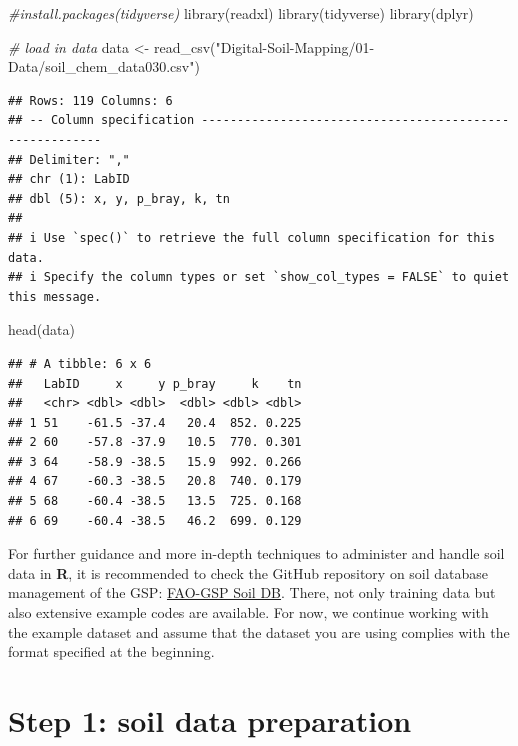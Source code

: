 \documentclass[
  10pt,
  b5paper,
  oneside]{book}
\newenvironment{Shaded}{\begin{snugshade}}{\end{snugshade}}
\newcommand{\CommentTok}[1]{\textcolor[rgb]{0.56,0.35,0.01}{\textit{#1}}}
\newcommand{\FunctionTok}[1]{\textcolor[rgb]{0.00,0.00,0.00}{#1}}
\newcommand{\NormalTok}[1]{#1}
\newcommand{\OtherTok}[1]{\textcolor[rgb]{0.56,0.35,0.01}{#1}}
\newcommand{\StringTok}[1]{\textcolor[rgb]{0.31,0.60,0.02}{#1}}
\begin{document}
\begin{Shaded}
\begin{Highlighting}[]
\CommentTok{\#install.packages(tidyverse)}
\FunctionTok{library}\NormalTok{(readxl)}
\FunctionTok{library}\NormalTok{(tidyverse)}
\FunctionTok{library}\NormalTok{(dplyr)}

\CommentTok{\# load in data}
\NormalTok{data }\OtherTok{\textless{}{-}} \FunctionTok{read\_csv}\NormalTok{(}\StringTok{"Digital{-}Soil{-}Mapping/01{-}Data/soil\_chem\_data030.csv"}\NormalTok{)}
\end{Highlighting}
\end{Shaded}

\begin{verbatim}
## Rows: 119 Columns: 6
## -- Column specification --------------------------------------------------------
## Delimiter: ","
## chr (1): LabID
## dbl (5): x, y, p_bray, k, tn
## 
## i Use `spec()` to retrieve the full column specification for this data.
## i Specify the column types or set `show_col_types = FALSE` to quiet this message.
\end{verbatim}

\begin{Shaded}
\begin{Highlighting}[]
\FunctionTok{head}\NormalTok{(data)}
\end{Highlighting}
\end{Shaded}

\begin{verbatim}
## # A tibble: 6 x 6
##   LabID     x     y p_bray     k    tn
##   <chr> <dbl> <dbl>  <dbl> <dbl> <dbl>
## 1 51    -61.5 -37.4   20.4  852. 0.225
## 2 60    -57.8 -37.9   10.5  770. 0.301
## 3 64    -58.9 -38.5   15.9  992. 0.266
## 4 67    -60.3 -38.5   20.8  740. 0.179
## 5 68    -60.4 -38.5   13.5  725. 0.168
## 6 69    -60.4 -38.5   46.2  699. 0.129
\end{verbatim}

For further guidance and more in-depth techniques to administer and handle soil data in \textbf{R}, it is recommended to check the GitHub repository on soil database management of the GSP: \href{https://github.com/FAO-GSP/SoilDB}{FAO-GSP Soil DB}. There, not only training data but also extensive example codes are available.
For now, we continue working with the example dataset and assume that the dataset you are using complies with the format specified at the beginning.

\hypertarget{step-1-soil-data-preparation}{%
\chapter{Step 1: soil data preparation}\label{step-1-soil-data-preparation}}
\end{document}
